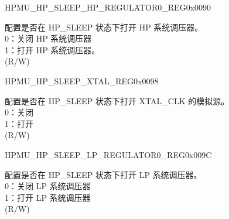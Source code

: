 \begin{register}{H}{PMU\_HP\_SLEEP\_HP\_REGULATOR0\_REG}{0x0090}\label{regdesc:PMUHPSLEEPHPREGULATOR0REG}
%
%
%
\regnewline%
\begin{regdesc}\begin{reglist}
\label{fielddesc:PMUHPSLEEPHPREGULATORXPD}\item [PMU\_HP\_SLEEP\_HP\_REGULATOR\_XPD] 配置是否在 HP\_SLEEP 状态下打开 HP 系统调压器。\\
0：关闭 HP 系统调压器 \\
1：打开 HP 系统调压器。\\
(R/W)
\end{reglist}\end{regdesc}
\end{register}


\begin{register}{H}{PMU\_HP\_SLEEP\_XTAL\_REG}{0x0098}\label{regdesc:PMUHPSLEEPXTALREG}
%
%
\regnewline%
\begin{regdesc}\begin{reglist}
\label{fielddesc:PMUHPSLEEPXPDXTAL}\item [PMU\_HP\_SLEEP\_XPD\_XTAL] 配置是否在 HP\_SLEEP 状态下打开 XTAL\_CLK 的模拟源。\\
0：关闭\\
1：打开\\
(R/W)
\end{reglist}\end{regdesc}
\end{register}


\begin{register}{H}{PMU\_HP\_SLEEP\_LP\_REGULATOR0\_REG}{0x009C}\label{regdesc:PMUHPSLEEPLPREGULATOR0REG}
%
%
%
%
%
\regnewline%
\begin{regdesc}\begin{reglist}
\label{fielddesc:PMUHPSLEEPLPREGULATORXPD}\item [PMU\_HP\_SLEEP\_LP\_REGULATOR\_XPD] 配置是否在 HP\_SLEEP 状态下打开 LP 系统调压器。\\
0：关闭 LP 系统调压器 \\
1：打开 LP 系统调压器\\
(R/W)
\end{reglist}\end{regdesc}
\end{register}


